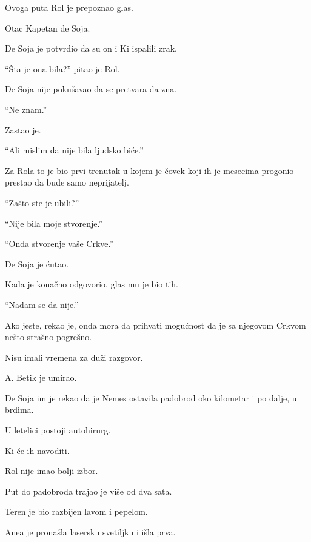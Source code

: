 \bigskip

Ovoga puta Rol je prepoznao glas.

Otac Kapetan de Soja.

\bigskip

De Soja je potvrdio da su on i Ki ispalili zrak.

\bigskip

``Šta je ona bila?'' pitao je Rol.

\bigskip

De Soja nije pokušavao da se pretvara da zna.

``Ne znam.''

Zastao je.

``Ali mislim da nije bila ljudsko biće.''

\bigskip

Za Rola to je bio prvi trenutak u kojem je čovek koji ih je mesecima progonio prestao da bude samo neprijatelj.

\bigskip

``Zašto ste je ubili?''

``Nije bila moje stvorenje.''

``Onda stvorenje vaše Crkve.''

\bigskip

De Soja je ćutao.

Kada je konačno odgovorio, glas mu je bio tih.

``Nadam se da nije.''

\bigskip

Ako jeste, rekao je, onda mora da prihvati mogućnost da je sa njegovom Crkvom nešto strašno pogrešno.

\bigskip

Nisu imali vremena za duži razgovor.

A. Betik je umirao.

\bigskip

De Soja im je rekao da je Nemes ostavila padobrod oko kilometar i po dalje, u brdima.

U letelici postoji autohirurg.

Ki će ih navoditi.

\bigskip

Rol nije imao bolji izbor.

\bigskip

Put do padobroda trajao je više od dva sata.

\bigskip

Teren je bio razbijen lavom i pepelom.

Anea je pronašla lasersku svetiljku i išla prva.

